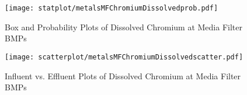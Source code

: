         \begin{figure}[hb]   %
            \centering
            \texttt{[image: statplot/metalsMFChromiumDissolvedprob.pdf]}
            \caption{Box and Probability Plots of Dissolved Chromium at Media Filter BMPs}
        \end{figure}         %
        
        
        \begin{figure}[hb]   %
            \centering
            \texttt{[image: scatterplot/metalsMFChromiumDissolvedscatter.pdf]}
            \caption{Influent vs. Effluent Plots of Dissolved Chromium at Media Filter BMPs}
        \end{figure}         %
        \clearpage
        